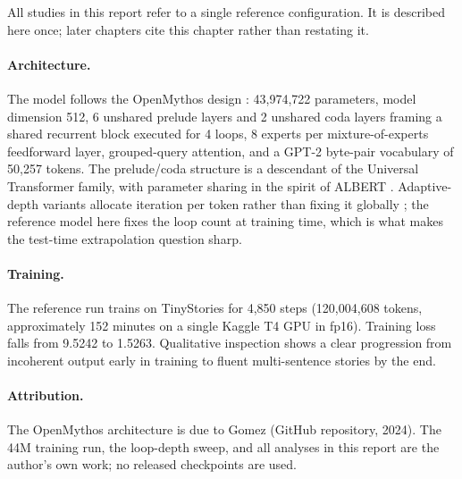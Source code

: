 All studies in this report refer to a single reference configuration.
It is described here once; later chapters cite this chapter rather than
restating it.

\paragraph{Architecture.} The model follows the OpenMythos design
\citep{gomez2024openmythos}: 43,974,722 parameters, model dimension 512,
6 unshared prelude layers and 2 unshared coda layers framing a shared
recurrent block executed for 4 loops, 8 experts per mixture-of-experts
feedforward layer, grouped-query attention, and a GPT-2 byte-pair
vocabulary of 50,257 tokens. The prelude/coda structure is a descendant
of the Universal Transformer \citep{dehghani2019universal} family, with
parameter sharing in the spirit of ALBERT \citep{lan2020albert}.
Adaptive-depth variants allocate iteration per token rather than fixing
it globally \citep{elbayad2020depth,raposo2024mixture}; the reference
model here fixes the loop count at training time, which is what makes
the test-time extrapolation question sharp.

\paragraph{Training.} The reference run trains on TinyStories
\citep{eldan2023tinystories} for 4,850 steps (120,004,608 tokens,
approximately 152 minutes on a single Kaggle T4 GPU in fp16). Training
loss falls from 9.5242 to 1.5263. Qualitative inspection shows a clear
progression from incoherent output early in training to fluent
multi-sentence stories by the end.

\paragraph{Attribution.} The OpenMythos architecture is due to Gomez
\citep{gomez2024openmythos} (GitHub repository, 2024). The 44M training
run, the loop-depth sweep, and all analyses in this report are the
author's own work; no released checkpoints are used.
